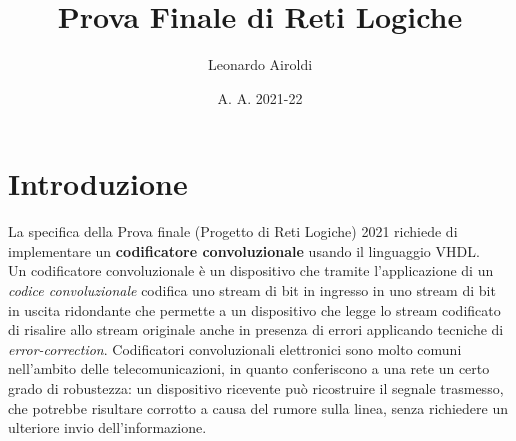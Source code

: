 \documentclass[a4paper]{report}
\title{Prova Finale di Reti Logiche} %
\author{Leonardo Airoldi} %
\date{A. A. 2021-22}
\begin{document}
\maketitle %


\tableofcontents
\newpage





\chapter{Introduzione}


La specifica della Prova finale (Progetto di Reti Logiche) 2021 richiede di implementare un \textbf{codificatore convoluzionale} usando il linguaggio VHDL.\\
Un codificatore convoluzionale è un dispositivo che tramite l'applicazione di un \textit{codice convoluzionale} codifica uno stream di bit in ingresso in uno stream di bit in uscita ridondante che permette a un dispositivo che legge lo stream codificato di risalire allo stream originale anche in presenza di errori applicando tecniche di \textit{error-correction}.
Codificatori convoluzionali elettronici sono molto comuni nell'ambito delle telecomunicazioni, in quanto conferiscono a una rete un certo grado di robustezza: un dispositivo ricevente può ricostruire il segnale trasmesso, che potrebbe risultare corrotto a causa del rumore sulla linea, senza richiedere un ulteriore invio dell'informazione.
\end{document}
